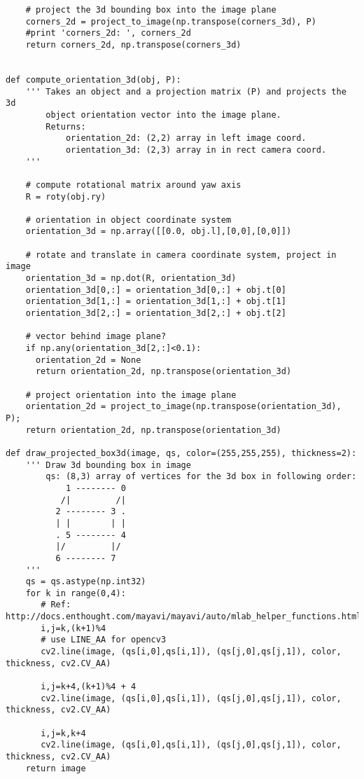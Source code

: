 \begin{lstlisting}
    # project the 3d bounding box into the image plane
    corners_2d = project_to_image(np.transpose(corners_3d), P)
    #print 'corners_2d: ', corners_2d
    return corners_2d, np.transpose(corners_3d)


def compute_orientation_3d(obj, P):
    ''' Takes an object and a projection matrix (P) and projects the 3d
        object orientation vector into the image plane.
        Returns:
            orientation_2d: (2,2) array in left image coord.
            orientation_3d: (2,3) array in in rect camera coord.
    '''
    
    # compute rotational matrix around yaw axis
    R = roty(obj.ry)
   
    # orientation in object coordinate system
    orientation_3d = np.array([[0.0, obj.l],[0,0],[0,0]])
    
    # rotate and translate in camera coordinate system, project in image
    orientation_3d = np.dot(R, orientation_3d)
    orientation_3d[0,:] = orientation_3d[0,:] + obj.t[0]
    orientation_3d[1,:] = orientation_3d[1,:] + obj.t[1]
    orientation_3d[2,:] = orientation_3d[2,:] + obj.t[2]
    
    # vector behind image plane?
    if np.any(orientation_3d[2,:]<0.1):
      orientation_2d = None
      return orientation_2d, np.transpose(orientation_3d)
    
    # project orientation into the image plane
    orientation_2d = project_to_image(np.transpose(orientation_3d), P);
    return orientation_2d, np.transpose(orientation_3d)

def draw_projected_box3d(image, qs, color=(255,255,255), thickness=2):
    ''' Draw 3d bounding box in image
        qs: (8,3) array of vertices for the 3d box in following order:
            1 -------- 0
           /|         /|
          2 -------- 3 .
          | |        | |
          . 5 -------- 4
          |/         |/
          6 -------- 7
    '''
    qs = qs.astype(np.int32)
    for k in range(0,4):
       # Ref: http://docs.enthought.com/mayavi/mayavi/auto/mlab_helper_functions.html
       i,j=k,(k+1)%4
       # use LINE_AA for opencv3
       cv2.line(image, (qs[i,0],qs[i,1]), (qs[j,0],qs[j,1]), color, thickness, cv2.CV_AA)

       i,j=k+4,(k+1)%4 + 4
       cv2.line(image, (qs[i,0],qs[i,1]), (qs[j,0],qs[j,1]), color, thickness, cv2.CV_AA)

       i,j=k,k+4
       cv2.line(image, (qs[i,0],qs[i,1]), (qs[j,0],qs[j,1]), color, thickness, cv2.CV_AA)
    return image
\end{lstlisting}
